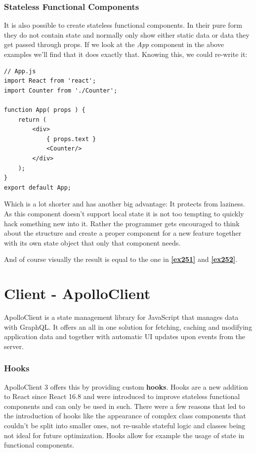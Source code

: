 \subsubsection{Stateless Functional Components}
It is also possible to create stateless functional components. In their pure form they do not contain state and normally only show either static data or data they get passed through props. If we look at the \emph{App} component in the above examples we'll find that it does exactly that. Knowing this, we could re-write it:
\begin{lstlisting}
// App.js
import React from 'react';
import Counter from './Counter';

function App( props ) {
	return (
		<div>
			{ props.text }
			<Counter/>
		</div>
	);
}
export default App;
\end{lstlisting}
Which is a lot shorter and has another big advantage: It protects from laziness. \cite{CoryHouse} As this component doesn't support local state it is not too tempting to quickly hack something new into it. Rather the programmer gets encouraged to think about the structure and create a proper component for a new feature together with its own state object that only that component needs.

And of course visually the result is equal to the one in \textbf{\ref{ex251}} and \textbf{\ref{ex252}}.

\section{Client - ApolloClient}
ApolloClient is a state management library for JavaScript that manages data with GraphQL. It offers an all in one solution for fetching, caching and modifying application data and together with automatic UI updates upon events from the server. \cite{ApolloClientIntro}

\subsubsection{Hooks}
ApolloClient 3 offers this by providing custom \textbf{hooks}. Hooks are a new addition to React since React 16.8 and were introduced to improve stateless functional components \cite{ReactHooksIntro} and can only be used in such. \cite{ReactHooksOverview} There were a few reasons that led to the introduction of hooks like the appearance of complex class components that couldn't be split into smaller ones, not re-usable stateful logic and classes being not ideal for future optimization. \cite{ReactHooksIntro} Hooks allow for example the usage of state in functional components.

